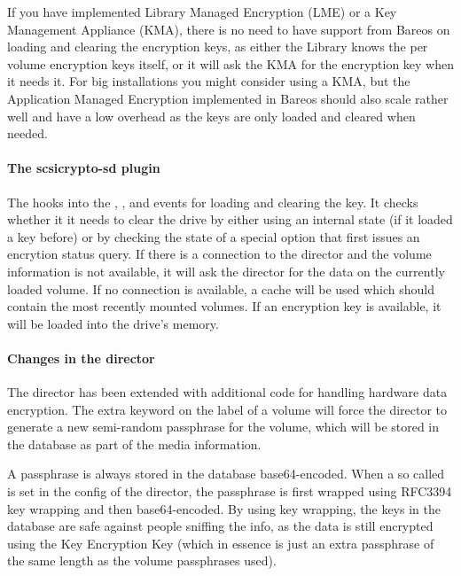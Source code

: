 If you have implemented Library Managed Encryption (LME) or a Key Management Appliance (KMA), there is no need to have support from Bareos on loading and clearing the encryption keys, as either the Library knows the per volume encryption keys itself, or it will ask the KMA for the encryption key when it needs it. For big installations you might consider using a KMA, but the Application Managed Encryption implemented in Bareos should also scale rather well and have a low overhead as the keys are only loaded and cleared when needed.

\paragraph{The scsicrypto-sd plugin}

The  hooks into the , ,  and  events for loading and clearing the key. It checks whether it it needs to clear the drive by either using an internal state (if it loaded a key before) or by checking the state of a special option that first issues an encrytion status query. If there is a connection to the director and the volume information is not available, it will ask the director for the data on the currently loaded volume. If no connection is available, a cache will be used which should contain the most recently mounted volumes. If an encryption key is available, it will be loaded into the drive's memory.

\paragraph{Changes in the director}

The director has been extended with additional code for handling hardware data encryption. The extra keyword  on the label of a volume will force the director to generate a new semi-random passphrase for the volume, which will be stored in the database as part of the media information.

A passphrase is always stored in the database base64-encoded. When a so called  is set in the config of the director, the passphrase is first wrapped using RFC3394 key wrapping and then base64-encoded. By using key wrapping, the keys in the database are safe against people sniffing the info, as the data is still encrypted using the Key Encryption Key (which in essence is just an extra passphrase of the same length as the volume passphrases used).

